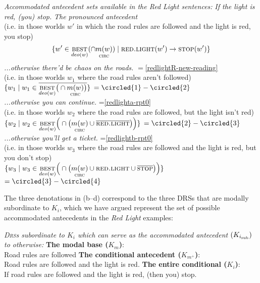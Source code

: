 \pex  \emph{Accommodated antecedent sets available in the \emph{Red Light} sentences:}
\a  \textit{If the light is red, (you) stop.} \hfill \textit{\small The pronounced antecedent}\\
(i.e. in those worlds $w'$ in which the road rules are followed and the light is red, you stop)
$$ \{ w'\in\underset{deo(w)}{\textsc{best}}(\cap\underset{\textsc{circ}}{m(w)})\mid \textsc{red.light}(w')\to\textsc{stop}(w')\} $$
%
\a  \textit{...otherwise there'd be chaos on the roads.} \hfill $=$\ref{redlightR-new-reading}\\
(i.e. in those worlds $ w_1 $ where the road rules aren't followed)\\[6pt]
\- \hfill $\{w_1\mid w_1\in\overline{\underset{deo(w)}{\textsc{best}}\big(\cap\underset{\textsc{circ}}{m(w)}\big)}\}$ 
\hfill $= \circled{1} - \circled{2} $ \\[6pt]
%
\a  \textit{...otherwise you can continue.} \hfill =\ref{redlighta-rpt0}\\
(i.e. in those worlds $ w_2 $ where the road rules are followed, but the light isn't red)\\[6pt]
\- \hfill $\{w_2\mid w_2\in\underset{deo(w)}{\textsc{best}}\Big(\cap\big(\underset{\textsc{circ}}{m(w)}\cup \overline{\textsc{red.light}}\big)\Big)\} $ \hfill $= \circled{2} - \circled{3} $ \\[6pt]
%
\a  \textit{...otherwise you'll get a ticket.} \hfill =\ref{redlightb-rpt0}\\
(i.e. in those worlds $ w_3 $ where the road rules are followed and the light is red, but you don't stop)\\[6pt]
\- \hfill $\{w_3\mid w_3\in\underset{deo(w)}{\textsc{best}}\Big(\cap\big(\underset{\textsc{circ}}{m(w)}\cup\textsc{red.light}\cup\overline{\textsc{stop}}\big)\Big)\} $ \hfill $= \circled{3} - \circled{4} $\xe


The three denotations in (b--d) correspond to the three DRSs that are modally subordinate to $K_i$, which we have argued represent the set of possible accommodated antecedents in the \textit{Red Light} examples: 

\pex  \emph{\textsc{Drs}s subordinate to $ K_i $ which can serve as the accommodated antecedent $ (K_{i_{\textup{sub}}}) $ to \emph{otherwise}:}
\a  \textbf{The modal base ($K_{m}$)}:\\ \hspace{2.5em} Road rules are followed
\a  \textbf{The conditional antecedent ($K_{m^+}$)}:\\\hspace{2.7em} Road rules are followed and the light is red. 
\a  \textbf{The entire conditional ($K_i$)}:\\ If road rules are followed and the light is red, (then you) stop. \xe


